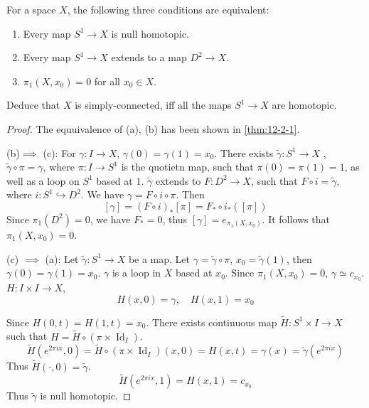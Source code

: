 \documentclass[../main.tex]{subfiles}
\begin{document}
\begin{proposition}{}{}
    
For a space $X$, the following three conditions are equivalent:
\begin{enumerate}
\item[(a)] Every map $S^{1} \to X$ is null homotopic.
\item[(b)] Every map $S^{1} \to X$ extends to a map $D^{2} \to X$.
\item[(c)] $\pi_{1}(X,x_{0}) = 0$ for all $x_{0} \in X$.
\end{enumerate}

Deduce that \(  X  \) is simply-connected, iff all the maps \(  S^{1}\to X  \) are homotopic.  
\end{proposition}

\begin{proof}
    The equuivalence of (a), (b) has been shown in \ref{thm:12-2-1}. 

  
    (b)\(  \implies   \) (c):   For \(   \gamma : I\to X  \), \(   \gamma \left( 0 \right)=  \gamma \left( 1 \right)= x_0    \). There exists \(   \tilde{\gamma} : S^{1}\to X  \) , \(   \tilde{\gamma} \circ  \pi =  \gamma   \), where \(   \pi : I\to S^{1}  \) is the quotietn map, such that \(   \pi \left( 0 \right)=  \pi \left( 1 \right)= 1    \), as well as a loop on \(  S^{1}  \) based at \(  1  \).   \(   \tilde{\gamma}   \) extends to \(  F:D^{2}\to X  \), such that \(  F\circ i=  \tilde{\gamma}   \), where \(  i: S^{1}\hookrightarrow D^{2}  \). We have \(   \gamma = F\circ i \circ  \pi   \). Then \[
    [ \gamma ]= \left( F\circ i \right)_{*}[ \pi ]= F_{*}\circ i_{*}\left( [ \pi ] \right)  
    \] Since \(   \pi _1 \left( D^{2} \right)= 0   \), we have \(  F_{*}= 0  \), thus \(  [ \gamma ]= e_{ \pi _1 \left( X,x_0 \right) }  \).  It follows that \(   \pi _1 \left( X,x_0 \right)= 0   \).
    
    (c) \(  \implies   \) (a): Let \(   \tilde{\gamma} : S^{1}\to X  \) be a map. Let \(   \gamma =  \tilde{\gamma} \circ  \pi   \), \(  x_0= \tilde{\gamma} \left( 1 \right)   \), then \(   \gamma \left( 0 \right)=  \gamma \left( 1 \right)= x_0   \).    \(   \gamma   \) is a loop in \(  X  \) based at \(  x_0  \). Since \(   \pi _1 \left( X,x_0 \right)= 0   \),     \(   \gamma \simeq  c _{x_0}  \). 
    \(  H: I\times I\to X  \), \[
    H\left( x,0 \right)=  \gamma ,\quad H\left( x,1 \right)= x_0  
    \] 
    
  Since \(  H \left( 0, t \right)= H\left( 1,t \right)=  x_0  \).  There exists continuous map \(  \tilde{H}: S^{1}\times I\to X  \) such that  \(  H= \tilde{H}\circ \left(  \pi \times \operatorname{Id}_{I} \right)   \).   \[
   \tilde{H}\left( e^{2 \pi ix},0 \right) = \tilde{H}\circ \left(  \pi \times \operatorname{Id}_{I} \right)\left( x,0 \right)= H\left( x,t \right)=  \gamma \left( x \right)=  \tilde{\gamma} \left( e^{2 \pi ix} \right)     
   \]Thus \(  \tilde{H}\left( \cdot ,0 \right)=  \tilde{\gamma}    \). \[
   \tilde{H}\left( e^{2 \pi ix},1 \right)= H\left( x,1 \right)= c_{x_0}  
   \] Thus \(   \tilde{\gamma}   \) is null homotopic. 
\end{proof}
\end{document}
